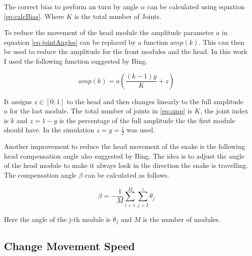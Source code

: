 The correct bias to perform an turn by angle $ \alpha $ can be calculated using equation \ref{eq:calcBias}. Where $ K $ is the total number of Joints.

To reduce the movement of the head module the amplitude parameter $ a $ in equation \ref{eq:jointAngles} can be replaced by a function $amp\left(k\right)$. This can then be used to reduce the amplitude for the front modules and the head. In this work I used the following function suggested by Bing\cite{Bing}.

\begin{equation}\label{eq:amp}
amp\left(k\right) = a \left(\frac{\left(k - 1\right) y}{K} + z\right)
\end{equation}

It assigns $z \in \left[0; 1\right]$ to the head and then changes linearly to the full amplitude $ a$ for the last module. The total number of joints in \ref{eq:amp} is $ K $, the joint index is $k$ and $z = 1 - y$ is the percentage of the full amplitude the the first module should have. In the simulation $ z = y = \frac{1}{2} $ was used.

Another improvement to reduce the head movement of the snake is the following head compensation angle also suggested by Bing\cite{Bing}. The idea is to adjust the angle of the head module to make it always look in the direction the snake is travelling. The compensation angle $ \beta $ can be calculated as follows.

\begin{equation}\label{eq:comp}
\beta = - \frac{1}{M}\sum_{i = 1}^{M}\sum_{j = 2}^{i} \theta_j
\end{equation}

Here the angle of the j-th module is $ \theta_j $ and $M$ is the number of modules.


\subsection{Change Movement Speed}


